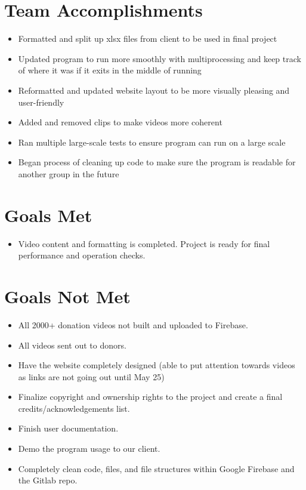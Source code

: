 \documentclass{article}
\begin{document}
\section{Team Accomplishments}
\begin{itemize}
    \item Formatted and split up xlsx files from client to be used in final project
    \item Updated program to run more smoothly with multiprocessing and keep track of where it was if it exits in the middle of running
    \item Reformatted and updated website layout to be more visually pleasing and user-friendly
    \item Added and removed clips to make videos more coherent
    \item Ran multiple large-scale tests to ensure program can run on a large scale
    \item Began process of cleaning up code to make sure the program is readable for another group in the future
\end{itemize}

\section{Goals Met}
\begin{itemize}
    \item Video content and formatting is completed. Project is ready for final performance and operation checks.
\end{itemize}

\section{Goals Not Met}
\begin{itemize}
    \item All 2000+ donation videos not built and uploaded to Firebase.
    \item All videos sent out to donors.
    \item Have the website completely designed (able to put attention towards videos as links are not going out until May 25)
    \item Finalize copyright and ownership rights to the project and create a final credits/acknowledgements list.
    \item Finish user documentation.
    \item Demo the program usage to our client.
    \item Completely clean code, files, and file structures within Google Firebase and the Gitlab repo.
\end{itemize}
\end{document}
